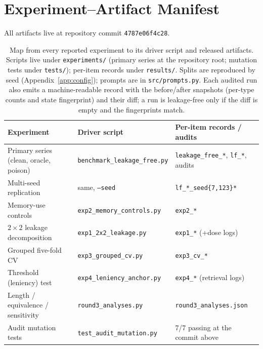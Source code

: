 \documentclass[]{ceurart}
\begin{document}


\appendix

\section{Experiment--Artifact Manifest}
\label{app:manifest}

All artifacts live at repository commit \texttt{4787e06f4c28}.

\begin{table}[h]
\centering
\footnotesize
\caption{Map from every reported experiment to its driver script and released artifacts. Scripts live under \texttt{experiments/} (primary series at the repository root; mutation tests under \texttt{tests/}); per-item records under \texttt{results/}. Splits are reproduced by seed (Appendix~\ref{app:config}); prompts are in \texttt{src/prompts.py}. Each audited run also emits a machine-readable record with the before/after snapshots (per-type counts and state fingerprint) and their diff; a run is leakage-free only if the diff is empty and the fingerprints match.}
\label{tab:manifest}
\begin{tabular}{lll}
\toprule
Experiment & Driver script & Per-item records / audits \\
\midrule
Primary series (clean, oracle, poison) & \texttt{benchmark\_leakage\_free.py} & \texttt{leakage\_free\_*}, \texttt{lf\_*}, audits \\
Multi-seed replication & same, \texttt{--seed} & \texttt{lf\_*\_seed\{7,123\}*} \\
Memory-use controls & \texttt{exp2\_memory\_controls.py} & \texttt{exp2\_*} \\
$2\times2$ leakage decomposition & \texttt{exp1\_2x2\_leakage.py} & \texttt{exp1\_*} (+dose logs) \\
Grouped five-fold CV & \texttt{exp3\_grouped\_cv.py} & \texttt{exp3\_cv\_*} \\
Threshold (leniency) test & \texttt{exp4\_leniency\_anchor.py} & \texttt{exp4\_*} (retrieval logs) \\
Length / equivalence / sensitivity & \texttt{round3\_analyses.py} & \texttt{round3\_analyses.json} \\
Audit mutation tests & \texttt{test\_audit\_mutation.py} & 7/7 passing at the commit above \\
\bottomrule
\end{tabular}

\end{table}
\end{document}
